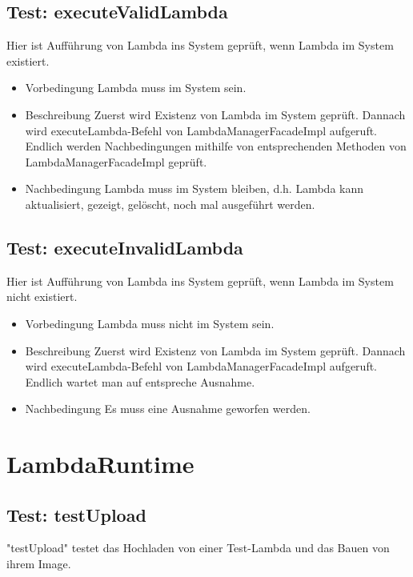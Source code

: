 \documentclass[a4paper,20pt,oneside]{book}
\begin{document}
\subsection{Test: executeValidLambda}
Hier ist Aufführung von Lambda ins System geprüft, wenn Lambda im System existiert.
\begin{itemize}
	\item Vorbedingung \linebreak
	Lambda muss im System sein.
	\item Beschreibung \linebreak
	Zuerst wird Existenz von Lambda im System geprüft. Dannach wird executeLambda-Befehl von LambdaManagerFacadeImpl aufgeruft. Endlich werden Nachbedingungen mithilfe von  entsprechenden Methoden von LambdaManagerFacadeImpl geprüft.
	\item Nachbedingung \linebreak
	Lambda muss im System bleiben, d.h. Lambda kann aktualisiert, gezeigt, gelöscht, noch mal ausgeführt werden.
\end{itemize}
\subsection{Test: executeInvalidLambda}
Hier ist Aufführung von Lambda ins System geprüft, wenn Lambda im System nicht  existiert.
\begin{itemize}
	\item Vorbedingung \linebreak
	Lambda muss nicht im System sein.
	\item Beschreibung \linebreak
	Zuerst wird Existenz von Lambda im System geprüft. Dannach wird executeLambda-Befehl von LambdaManagerFacadeImpl aufgeruft. Endlich wartet man auf entspreche Ausnahme.
	\item Nachbedingung \linebreak
	Es muss eine Ausnahme geworfen werden.
\end{itemize}

\newpage
  \section{LambdaRuntime} 
\subsection{Test: testUpload}			
	"testUpload" testet das Hochladen von einer Test-Lambda und das Bauen von ihrem Image.
\end{document}
